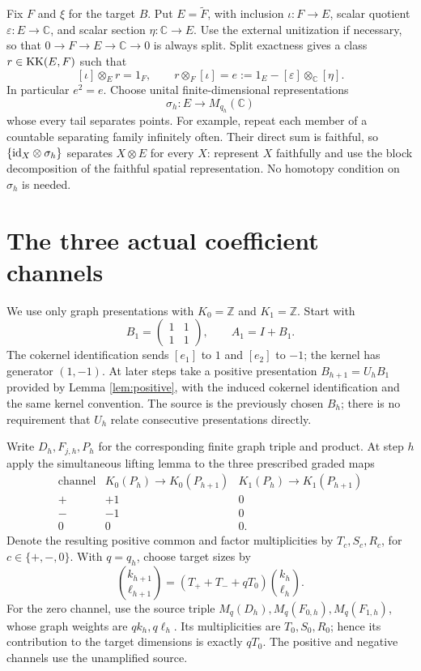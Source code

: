 \documentclass[11pt,letterpaper]{amsart}
\theoremstyle{remark}\newtheorem{remark}[theorem]{Remark}
\newcommand{\Z}{\mathbb Z}\newcommand{\C}{\mathbb C}
\begin{document}
Fix $F$ and $\xi$ for the target $B$. Put $E=\widetilde F$, with
inclusion $\iota:F\to E$, scalar quotient $\varepsilon:E\to\C$,
and scalar section $\eta:\C\to E$. Use the external unitization if
necessary, so that $0\to F\to E\to\C\to0$ is always split.
Split exactness gives a class $r\in\operatorname{KK}(E,F)$ such that
\begin{equation}\label{eq:split}
 [\iota]\otimes_Er=1_F,\qquad
 r\otimes_F[\iota]=e:=1_E-[\varepsilon]\otimes_\C[\eta].
\end{equation}
In particular $e^2=e$. Choose unital finite-dimensional representations
\[
                 \sigma_h:E\longrightarrow M_{q_h}(\C)
\]
whose every tail separates points. For example, repeat each member of
a countable separating family infinitely often. Their direct sum is
faithful, so $\{\mathrm{id}_X\otimes\sigma_h\}$ separates $X\otimes E$ for
every $X$: represent $X$ faithfully and use the block decomposition of
the faithful spatial representation. No homotopy condition on $\sigma_h$
is needed.

\section{The three actual coefficient channels}\label{sec:channels}
We use only graph presentations with $K_0=\Z$ and $K_1=\Z$.
Start with
\[
 B_1=\begin{pmatrix}1&1\\1&1\end{pmatrix},\qquad A_1=I+B_1.
\]
The cokernel identification sends $[e_1]$ to $1$ and $[e_2]$ to $-1$;
the kernel has generator $(1,-1)$. At later steps take a positive
presentation $B_{h+1}=U_hB_1$ provided by Lemma \ref{lem:positive},
with the induced cokernel identification and the same kernel convention.
The source is the previously chosen $B_h$; there is no requirement that
$U_h$ relate consecutive presentations directly.

Write $D_h,F_{j,h},P_h$ for the corresponding finite graph triple and
product. At step $h$ apply the simultaneous lifting lemma to the three
prescribed graded maps
\begin{equation}\label{eq:threeK}
 \begin{array}{c|cc}
 \text{channel}&K_0(P_h)\to K_0(P_{h+1})&K_1(P_h)\to K_1(P_{h+1})\\\hline
 +&+1&0\\
 -&-1&0\\
 0&0&0.
 \end{array}
\end{equation}
Denote the resulting positive common and factor multiplicities by
$T_c,S_c,R_c$, for $c\in\{+,-,0\}$. With $q=q_h$, choose target sizes
by
\begin{equation}\label{eq:dimensions}
 \binom{k_{h+1}}{\ell_{h+1}}
       =(T_++T_-+qT_0)\binom{k_h}{\ell_h}.
\end{equation}
For the zero channel, use the source triple
$M_q(D_h),M_q(F_{0,h}),M_q(F_{1,h})$, whose graph weights are
$qk_h,q\ell_h$. Its multiplicities are $T_0,S_0,R_0$; hence its
contribution to the target dimensions is exactly $qT_0$.
The positive and negative channels use the unamplified source.
\end{document}
